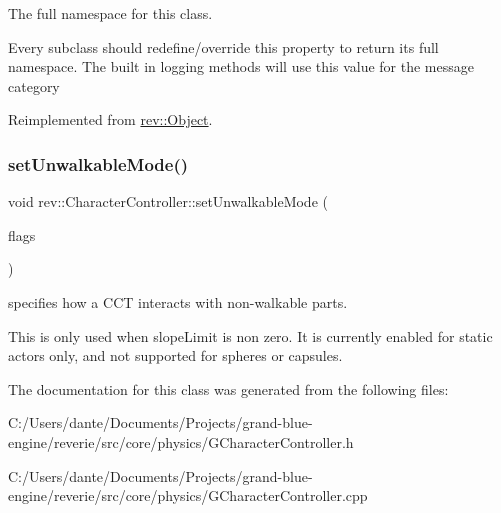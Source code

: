 The full namespace for this class. 

Every subclass should redefine/override this property to return its full namespace. The built in logging methods will use this value for the message category 

Reimplemented from \mbox{\hyperlink{classrev_1_1_object_aaeb638d3e10f361c56c211a318a27f3d}{rev\+::\+Object}}.

\mbox{\label{classrev_1_1_character_controller_afb094036c3828216a35d94d4116ef589}} 
\subsubsection{\texorpdfstring{setUnwalkableMode()}{setUnwalkableMode()}}
{\footnotesize\ttfamily void rev\+::\+Character\+Controller\+::set\+Unwalkable\+Mode (\begin{DoxyParamCaption}\item[{const Walkable\+Flags \&}]{flags }\end{DoxyParamCaption})\hspace{0.3cm}{\ttfamily [inline]}}



specifies how a C\+CT interacts with non-\/walkable parts. 

This is only used when slope\+Limit is non zero. It is currently enabled for static actors only, and not supported for spheres or capsules. 

The documentation for this class was generated from the following files\+:\begin{DoxyCompactItemize}
\item 
C\+:/\+Users/dante/\+Documents/\+Projects/grand-\/blue-\/engine/reverie/src/core/physics/G\+Character\+Controller.\+h\item 
C\+:/\+Users/dante/\+Documents/\+Projects/grand-\/blue-\/engine/reverie/src/core/physics/G\+Character\+Controller.\+cpp\end{DoxyCompactItemize}
